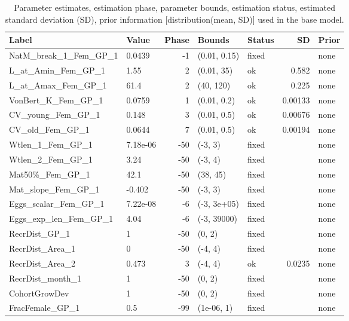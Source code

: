 \documentclass[
  english,
]{article}
\begin{document}
\begin{landscape}
\begingroup
\fontsize{9.0pt}{11.0pt}\selectfont

\begin{longtable}{llrllrl}

\caption{\label{tbl-pars}Parameter estimates, estimation phase,
parameter bounds, estimation status, estimated standard deviation (SD),
prior information {[}distribution(mean, SD){]} used in the base model.}

\tabularnewline

\toprule
Label & Value & Phase & Bounds & Status & SD & Prior \\ 
\midrule\addlinespace[2.5pt]
NatM\_break\_1\_Fem\_GP\_1 & 0.0439 & -1 & (0.01, 0.15) & fixed &  & none \\ 
L\_at\_Amin\_Fem\_GP\_1 & 1.55 & 2 & (0.01, 35) & ok & 0.582 & none \\ 
L\_at\_Amax\_Fem\_GP\_1 & 61.4 & 2 & (40, 120) & ok & 0.225 & none \\ 
VonBert\_K\_Fem\_GP\_1 & 0.0759 & 1 & (0.01, 0.2) & ok & 0.00133 & none \\ 
CV\_young\_Fem\_GP\_1 & 0.148 & 3 & (0.01, 0.5) & ok & 0.00676 & none \\ 
CV\_old\_Fem\_GP\_1 & 0.0644 & 7 & (0.01, 0.5) & ok & 0.00194 & none \\ 
Wtlen\_1\_Fem\_GP\_1 & 7.18e-06 & -50 & (-3, 3) & fixed &  & none \\ 
Wtlen\_2\_Fem\_GP\_1 & 3.24 & -50 & (-3, 4) & fixed &  & none \\ 
Mat50\%\_Fem\_GP\_1 & 42.1 & -50 & (38, 45) & fixed &  & none \\ 
Mat\_slope\_Fem\_GP\_1 & -0.402 & -50 & (-3, 3) & fixed &  & none \\ 
Eggs\_scalar\_Fem\_GP\_1 & 7.22e-08 & -6 & (-3, 3e+05) & fixed &  & none \\ 
Eggs\_exp\_len\_Fem\_GP\_1 & 4.04 & -6 & (-3, 39000) & fixed &  & none \\ 
RecrDist\_GP\_1 & 1 & -50 & (0, 2) & fixed &  & none \\ 
RecrDist\_Area\_1 & 0 & -50 & (-4, 4) & fixed &  & none \\ 
RecrDist\_Area\_2 & 0.473 & 3 & (-4, 4) & ok & 0.0235 & none \\ 
RecrDist\_month\_1 & 1 & -50 & (0, 2) & fixed &  & none \\ 
CohortGrowDev & 1 & -50 & (0, 2) & fixed &  & none \\ 
FracFemale\_GP\_1 & 0.5 & -99 & (1e-06, 1) & fixed &  & none \\ 

\end{longtable}
\end{landscape}
\end{document}
